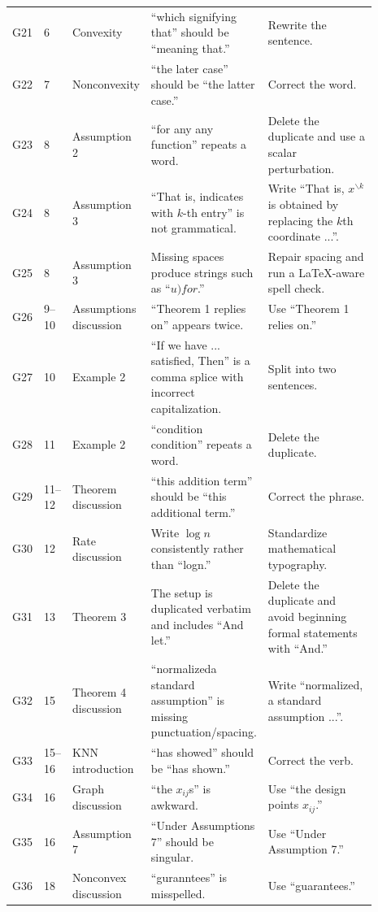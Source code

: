 \documentclass[11pt]{article}
\begin{document}
\begin{landscape}
\begin{longtable}{L{0.045\linewidth}L{0.065\linewidth}L{0.16\linewidth}L{0.31\linewidth}L{0.31\linewidth}}
G21 & 6 & Convexity & “which signifying that” should be “meaning that.” & Rewrite the sentence.\\
G22 & 7 & Nonconvexity & “the later case” should be “the latter case.” & Correct the word.\\
G23 & 8 & Assumption 2 & “for any any function” repeats a word. & Delete the duplicate and use a scalar perturbation.\\
G24 & 8 & Assumption 3 & “That is, indicates with $k$-th entry” is not grammatical. & Write “That is, $x^{\backslash k}$ is obtained by replacing the $k$th coordinate ...”.\\
G25 & 8 & Assumption 3 & Missing spaces produce strings such as “$u)for$.” & Repair spacing and run a LaTeX-aware spell check.\\
G26 & 9--10 & Assumptions discussion & “Theorem 1 replies on” appears twice. & Use “Theorem 1 relies on.”\\
G27 & 10 & Example 2 & “If we have ... satisfied, Then” is a comma splice with incorrect capitalization. & Split into two sentences.\\
G28 & 11 & Example 2 & “condition condition” repeats a word. & Delete the duplicate.\\
G29 & 11--12 & Theorem discussion & “this addition term” should be “this additional term.” & Correct the phrase.\\
G30 & 12 & Rate discussion & Write $\log n$ consistently rather than “logn.” & Standardize mathematical typography.\\
G31 & 13 & Theorem 3 & The setup is duplicated verbatim and includes “And let.” & Delete the duplicate and avoid beginning formal statements with “And.”\\
G32 & 15 & Theorem 4 discussion & “normalizeda standard assumption” is missing punctuation/spacing. & Write “normalized, a standard assumption ...”.\\
G33 & 15--16 & KNN introduction & “has showed” should be “has shown.” & Correct the verb.\\
G34 & 16 & Graph discussion & “the $x_{ij}$s” is awkward. & Use “the design points $x_{ij}$.”\\
G35 & 16 & Assumption 7 & “Under Assumptions 7” should be singular. & Use “Under Assumption 7.”\\
G36 & 18 & Nonconvex discussion & “guranntees” is misspelled. & Use “guarantees.”\\

\end{longtable}
\end{landscape}
\end{document}

